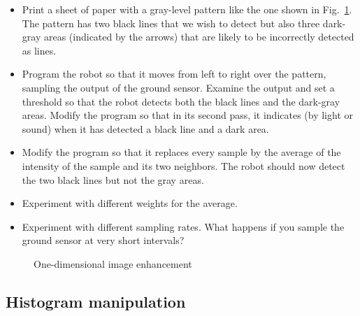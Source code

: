 \begin{framed}
\begin{itemize}
\item Print a sheet of paper with a gray-level pattern like the one shown in Fig.~\ref{fig.one-enhance}. The pattern has two black lines that we wish to detect but also three dark-gray areas (indicated by the arrows) that are likely to be incorrectly detected as lines.
\item Program the robot so that it moves from left to right over the pattern, sampling the output of the ground sensor. Examine the output and set a threshold so that the robot detects both the black lines and the dark-gray areas. Modify the program so that in its second pass, it indicates (by light or sound) when it has detected a black line and a dark area.
\item Modify the program so that it replaces every sample by the average of the intensity of the sample and its two neighbors. The robot should now detect the two black lines but not the gray areas.
\item Experiment with different weights for the average.
\item Experiment with different sampling rates. What happens if you sample the ground sensor at very short intervals?
\end{itemize}
\end{framed}

\begin{figure}
\begin{center}
\caption{One-dimensional image enhancement}\label{fig.one-enhance}
\end{center}
\end{figure}

\subsection{Histogram manipulation}

